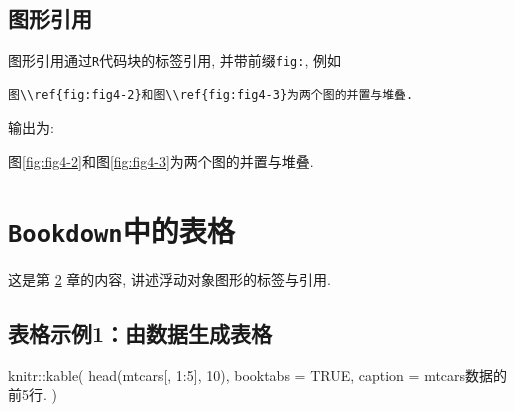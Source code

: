 \documentclass[12pt,]{krantz}
\newenvironment{Shaded}{\begin{snugshade}}{\end{snugshade}}
\newcommand{\AttributeTok}[1]{\textcolor[rgb]{0.77,0.63,0.00}{#1}}
\newcommand{\ConstantTok}[1]{\textcolor[rgb]{0.00,0.00,0.00}{#1}}
\newcommand{\DecValTok}[1]{\textcolor[rgb]{0.00,0.00,0.81}{#1}}
\newcommand{\FunctionTok}[1]{\textcolor[rgb]{0.00,0.00,0.00}{#1}}
\newcommand{\NormalTok}[1]{#1}
\newcommand{\SpecialCharTok}[1]{\textcolor[rgb]{0.00,0.00,0.00}{#1}}
\newcommand{\StringTok}[1]{\textcolor[rgb]{0.31,0.60,0.02}{#1}}
\theoremstyle{plain}
\theoremstyle{nonumberplain}
\begin{document}
\hypertarget{sec5-5}{%
\section{图形引用}\label{sec5-5}}

\indent

图形引用通过\texttt{R}代码块的标签引用, 并带前缀\texttt{fig:}, 例如

\begin{verbatim}
图\\ref{fig:fig4-2}和图\\ref{fig:fig4-3}为两个图的并置与堆叠. 
\end{verbatim}

输出为:

图\ref{fig:fig4-2}和图\ref{fig:fig4-3}为两个图的并置与堆叠.

\printbibliography[segment=\therefsegment, heading=subbibliography, title={参考文献}]

\hypertarget{tables}{%
\chapter{\texorpdfstring{\texttt{Bookdown}中的表格}{Bookdown中的表格}}\label{tables}}

\indent

这是第 \ref{tables} 章的内容, 讲述浮动对象图形的标签与引用. \autocite{xie2015,bookdown2016}

\hypertarget{sec6-1}{%
\section{表格示例1：由数据生成表格}\label{sec6-1}}

\begin{Shaded}
\begin{Highlighting}[]
\NormalTok{knitr}\SpecialCharTok{::}\FunctionTok{kable}\NormalTok{(}
  \FunctionTok{head}\NormalTok{(mtcars[, }\DecValTok{1}\SpecialCharTok{:}\DecValTok{5}\NormalTok{], }\DecValTok{10}\NormalTok{), }\AttributeTok{booktabs =} \ConstantTok{TRUE}\NormalTok{,}
  \AttributeTok{caption =} \StringTok{\textquotesingle{}mtcars数据的前5行.\textquotesingle{}}
\NormalTok{)}
\end{Highlighting}
\end{Shaded}
\end{document}
